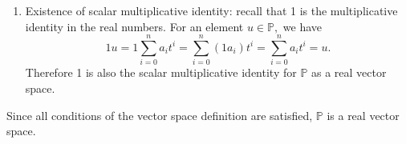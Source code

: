 \documentclass{exam}
\begin{document}
\begin{enumerate}[label=(\alph*)]
    \item Existence of scalar multiplicative identity: recall that 1 is the multiplicative identity in the real numbers. For an element $u\in\mathbb{P},$ we have $$1u=1\sum_{i=0}^n a_i t^i=\sum_{i=0}^n (1a_i) t^i=\sum_{i=0}^n a_i t^i=u.$$ Therefore 1 is also the scalar multiplicative identity for $\mathbb{P}$ as a real vector space.
\end{enumerate}

Since all conditions of the vector space definition are satisfied, $\mathbb{P}$ is a real vector space.
\end{document}
